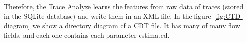 Therefore, the Trace Analyze learns the features from raw data of traces (stored in the SQLite database) and write them in an XML file.  In the figure~\ref{fig:CTD-diagram} we show a directory diagram of a CDT file. It has many of many flow fields, and each one contains each parameter estimated. 

%


